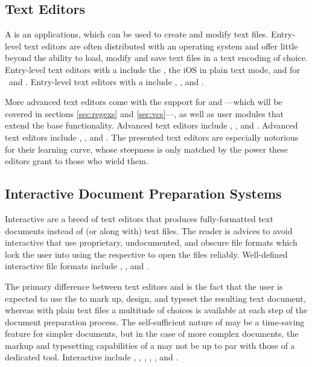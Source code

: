 \subsection{Text Editors}
A  is an applications, which can be used to create and modify
text files. Entry-level text editors are often distributed with an operating
system and offer little beyond the ability to load, modify and save text files
in a text encoding of choice. Entry-level text editors with a 
include the , the iOS  in plain text mode,
and  for \Linux\ and . Entry-level text editors with a
 include , 
, and .

More advanced text editors come with the support for 
and ---which will be covered in sections \ref{sec:regexs}
and \ref{sec:vcs}---, as well as user modules that extend the base
functionality.  Advanced  text editors include ,
, and . Advanced  text editors include
, , and . The presented 
text editors are especially notorious for their learning curve, whose steepness
is only matched by the power these editors grant to those who wield them.

\subsection{Interactive Document Preparation Systems}
Interactive  are a breed of text
editors that produces fully-formatted text documents instead of (or along with)
text files. The reader is advices to avoid interactive  that use
proprietary, undocumented, and obscure file formats which lock the user into
using the respective  to open the files reliably. Well-defined
interactive  file formats include , ,
and .

The primary difference between text editors and  is the fact that
the user is expected to use the  to mark up, design, and typeset the
resulting text document, whereas with plain text files a multitude of choices is
available at each step of the document preparation process. The self-sufficient
nature of  may be a time-saving feature for simpler documents, but
in the case of more complex documents, the markup and typesetting capabilities
of a  may not be up to par with those of a dedicated tool.
Interactive  include , ,
, , ,  and .


